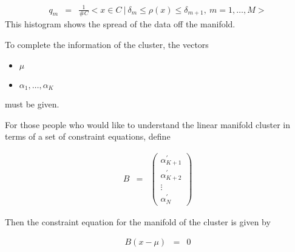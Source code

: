 \begin{eqnarray*}
q_m&=&\frac{1}{\#C}<x\in C\ | \ \delta_m \le \rho(x) \le \delta_{m+1},\ m=1,\ldots,M>
\end{eqnarray*}
This histogram shows the spread of the data off the manifold.

To complete the information of the cluster, the vectors
\begin{itemize}
\item $\mu$
\item $\alpha_1,\ldots,\alpha_K$
\end{itemize}
must be given.

For those people who would like to understand the linear manifold cluster
in terms of a set of constraint equations, define

\begin{eqnarray*}
B&=&\left(\begin{array}{c}
               \alpha_{K+1}^\prime\\
               \alpha_{K+2}^\prime\\
               \vdots\\
               \alpha_{N}^\prime
               \end{array}\right)
\end{eqnarray*}

Then the constraint equation for the manifold of the cluster is given by

\begin{eqnarray*}
B(x-\mu)&=&0
\end{eqnarray*}
